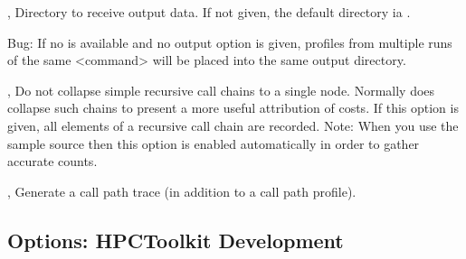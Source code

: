 \documentclass[english]{article}
\begin{document}
\begin{Description}
\item[\OptArg{-o}{outpath}, \OptArg{--output}{outpath}]
Directory to receive output data.
If not given, the default directory ia .
\begin{itemize}
 Bug: If no  is available and no output option is given,
 profiles from multiple runs of the same <command>  will be placed into the same output directory.
\end{itemize}

 \item[\Opt{-r}, \Opt{--retain-recursion}]
Do not collapse simple recursive call chains to a single node.
Normally  does collapse such chains to present a more useful attribution of costs.
If this option is given, all elements of a recursive call chain are recorded.
Note: When you use the  sample source then this option is enabled automatically
in order to gather accurate counts.

\item[\Opt{-t}, \Opt{--trace}]
Generate a call path trace (in addition to a call path profile).

\end{Description}

\subsection{Options: HPCToolkit Development}
\end{document}
